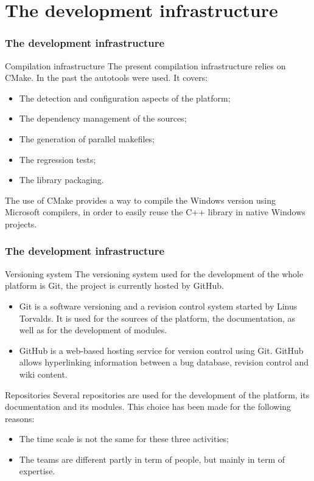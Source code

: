 \documentclass[8pt]{beamer}
\begin{document}
\section[The development infrastructure]{The development infrastructure}
\begin{frame}
  \frametitle{The development infrastructure}
  \begin{block}{Compilation infrastructure}
    The present compilation infrastructure relies on CMake.
    In the past the autotools were used. 
    It covers:
    \begin{itemize}
    \item The detection and configuration aspects of the platform;
    \item The dependency management of the sources;
    \item The generation of parallel makefiles;
    \item The regression tests;
    \item The library packaging.
    \end{itemize}
    The use of CMake provides a way to compile the Windows version using Microsoft compilers, in order to easily reuse the C++ library in native Windows projects.
  \end{block}
\end{frame}
\begin{frame}
  \frametitle{The development infrastructure}
  \begin{block}{Versioning system}
    The versioning system used for the development of the whole platform is Git, the project is currently hosted by GitHub.
    \begin{itemize}
    \item \alert{Git} is a software versioning and a revision control system started by Linus Torvalds. It is used for the sources of the platform, the documentation, as well as for the development of modules.
    \item \alert{GitHub} is a web-based hosting service for version control using Git. GitHub allows hyperlinking information between a bug database, revision control and wiki content.
    \end{itemize}
  \end{block}
  \begin{block}{Repositories}
    Several repositories are used for the development of the platform, its documentation and its modules. This choice has been made for the following reasons:
    \begin{itemize}
    \item The time scale is not the same for these three activities;
    \item The teams are different partly in term of people, but mainly in term of expertise.
    \end{itemize}
  \end{block}
\end{frame}
\end{document}
